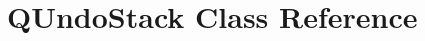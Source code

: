 \hypertarget{classUndo__Redo_1_1QUndoStack}{}\section{Q\+Undo\+Stack Class Reference}
\label{classUndo__Redo_1_1QUndoStack}

